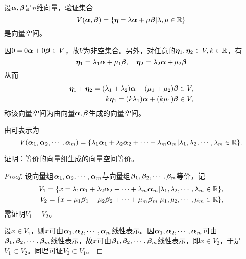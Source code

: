 \begin{li}
  设$\boldsymbol{\alpha},\boldsymbol{\beta}$是$n$维向量，验证集合
  $$
  V(\boldsymbol{\alpha},\boldsymbol{\beta})=\{\boldsymbol{\eta}=\lambda\boldsymbol{\alpha}+\mu\boldsymbol{\beta}|\lambda,\mu\in\mathbb R\}
  $$
  是向量空间。
\end{li}
\begin{jie}
  因$0=0\boldsymbol{\alpha}+0\boldsymbol{\beta}\in V$，故$V$为非空集合。另外，对任意的$\boldsymbol{\eta}_1,\boldsymbol{\eta}_2\in V, k\in \mathbb R$，有
  $$
  \boldsymbol{\eta}_1=\lambda_1\boldsymbol{\alpha}+\mu_1\boldsymbol{\beta}, \quad
  \boldsymbol{\eta}_2=\lambda_2\boldsymbol{\alpha}+\mu_2\boldsymbol{\beta}
  $$
  从而
  $$
  \begin{aligned}
    \boldsymbol{\eta}_1+\boldsymbol{\eta}_2=(\lambda_1+\lambda_2)\boldsymbol{\alpha}+(\mu_1+\mu_2)\boldsymbol{\beta}\in V,\\
    k\boldsymbol{\eta}_1=(k\lambda_1)\boldsymbol{\alpha}+(k\mu_1)\boldsymbol{\beta}\in V,
  \end{aligned}
  $$
  称该向量空间为由向量$\boldsymbol{\alpha},\boldsymbol{\beta}$生成的向量空间。
\end{jie}

\begin{dingyi}
  由可表示为
  $$
  V(\boldsymbol{\alpha}_1,\boldsymbol{\alpha}_2,\cdots,\boldsymbol{\alpha}_m)=\{\lambda_1\boldsymbol{\alpha}_1+\lambda_2\boldsymbol{\alpha}_2+\cdots+\lambda_m\boldsymbol{\alpha}_m|\lambda_1,\lambda_2,\cdots,\lambda_m\in \mathbb R\}.
  $$
\end{dingyi}

\begin{li}
证明：等价的向量组生成的向量空间等价。
\end{li}
\begin{proof}
  设向量组$\boldsymbol{\alpha}_1,\boldsymbol{\alpha}_2,\cdots,\boldsymbol{\alpha}_m$与向量组$\boldsymbol{\beta}_1,\boldsymbol{\beta}_2,\cdots,\boldsymbol{\beta}_m$等价，记
  $$
  \begin{aligned}
    V_1=\{x=\lambda_1\boldsymbol{\alpha}_1+\lambda_2\boldsymbol{\alpha}_2+\cdots+\lambda_m\boldsymbol{\alpha}_m|\lambda_1,\lambda_2,\cdots,\lambda_m\in \mathbb R\},\\
    V_2=\{x=\mu_1\boldsymbol{\beta}_1+\mu_2\boldsymbol{\beta}_2+\cdots+\mu_m\boldsymbol{\beta}_m|\mu_1,\mu_2,\cdots,\mu_m\in \mathbb R\},
  \end{aligned}
  $$
  需证明$V_1=V_2$。

  设$x\in V_1$，则$x$可由$\boldsymbol{\alpha}_1,\boldsymbol{\alpha}_2,\cdots,\boldsymbol{\alpha}_m$线性表示。因$\boldsymbol{\alpha}_1,\boldsymbol{\alpha}_2,\cdots,\boldsymbol{\alpha}_m$可由$\boldsymbol{\beta}_1,\boldsymbol{\beta}_2,\cdots,\boldsymbol{\beta}_m$线性表示，故$x$可由$\boldsymbol{\beta}_1,\boldsymbol{\beta}_2,\cdots,\boldsymbol{\beta}_m$线性表示，即$x\in V_2$，于是$V_1\subset V_2$。同理可证$V_2\subset V_1$。
\end{proof}